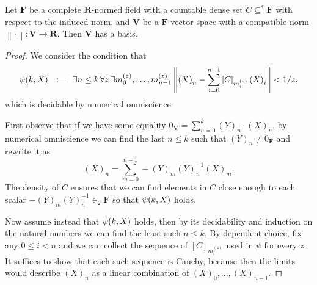 \documentclass[11pt]{article}
\theoremstyle{plain}
\theoremstyle{definition}
\begin{document}
\begin{corollary}
    Let $\mathbf{F}$ be a complete $\mathbf{R}$-normed field with a countable dense set $C \subseteq^* \mathbf{F}$ with respect to the induced norm, and $\mathbf{V}$ be a $\mathbf{F}$-vector space with a compatible norm $\left\|\cdot\right\| : \mathbf{V} \rightarrow \mathbf{R}$. Then $\mathbf{V}$ has a basis.
\end{corollary}

\begin{proof}
    We consider the condition that
    \[\psi\mleft(k, X\mright) \ \ \coloneqq \ \ \exists n \leq k \, \forall z \, \exists m^{\left(z\right)}_0, \ldots, m^{\left(z\right)}_{n - 1} \left\|\left(X\right)_n - \sum_{i = 0}^{n - 1} \left[C\right]_{m^{\left(z\right)}_i} \left(X\right)_i\right\| < 1 / z,\]
    which is decidable by numerical omniscience.

    First observe that if we have some equality $0_\mathbf{V} = \sum_{n = 0}^k \left(Y\right)_n \cdot \left(X\right)_n$, by numerical omniscience we can find the last $n \leq k$ such that $\left(Y\right)_n \neq 0_\mathbf{F}$ and rewrite it as
    \[\left(X\right)_n = \sum_{m = 0}^{n - 1} - \left(Y\right)_m \left(Y\right)_n^{-1} \left(X\right)_m.\]
    The density of $C$ ensures that we can find elements in $C$ close enough to each scalar $- \left(Y\right)_m \left(Y\right)_n^{-1} \in_2 \mathbf{F}$ so that $\psi\mleft(k, X\mright)$ holds.

    Now assume instead that $\psi\mleft(k, X\mright)$ holds, then by its decidability and induction on the natural numbers we can find the least such $n \leq k$. By dependent choice, fix any $0 \leq i < n$ and we can collect the sequence of $\left[C\right]_{m^{\left(z\right)}_i}$ used in $\psi$ for every $z$. It suffices to show that each such sequence is Cauchy, because then the limits would describe $\left(X\right)_n$ as a linear combination of $\left(X\right)_0, \ldots, \left(X\right)_{n - 1}$.


\end{proof}
\end{document}

